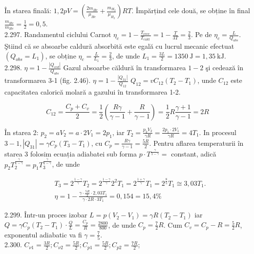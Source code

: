 \documentclass[10pt]{article}
\begin{document}
În starea finală: $1,2 p V=\left(\frac{2 m_{H e}}{\mu_{H e}}+\frac{m_{H_{2}}}{\mu_{H_{2}}}\right) R T$. Împărțind cele două, se obține în final $\frac{m_{H e}}{m_{H e}}=\frac{1}{2}=0,5$.\\
2.297. Randamentul ciclului Carnot $\eta_{c}=1-\frac{T_{\text {rece }}}{T_{\text {cald }}}=1-\frac{T}{3 T}=\frac{2}{3}$. Pe de $\eta_{c}=\frac{L}{Q_{a b s}}$. Ştiind că se absoarbe caldură absorbită este egală cu lucrul mecanic efectuat $\left(Q_{o b s}=L_{1}\right)$, se obține $\eta_{c}=\frac{L}{L_{1}}=\frac{2}{3}$, de unde $L_{1}=\frac{3 L}{2}=1350 \mathrm{~J}=1,35 \mathrm{~kJ}$.\\
2.298. $\eta=1-\frac{\left|Q_{c e d}\right|}{Q_{a b s}}$ Gazul absoarbe căldură în transformarea $1-2$ şi cedează în transformarea 3-1 (fig. 2.46). $\eta=1-\frac{\left|Q_{31}\right|}{Q_{12}}$ $Q_{12}=v C_{12}\left(T_{2}-T_{1}\right)$, unde $C_{12}$ este capacitatea calorică molară a gazului în transformarea 1-2.

$$
C_{12}=\frac{C_{p}+C_{v}}{2}=\frac{1}{2}\left(\frac{R \gamma}{\gamma-1}+\frac{R}{\gamma-1}\right)=\frac{1}{2} R \frac{\gamma+1}{\gamma-1}=2 R
$$

În starea 2: $p_{2}=a V_{2}=a \cdot 2 V_{1}=2 p_{1}$, iar $T_{2}=\frac{p_{2} V_{2}}{\gamma R}=\frac{2 p_{1} \cdot 2 V_{1}}{\gamma R}=4 T_{1}$. In procesul $3-1,\left|Q_{31}\right|=\gamma C_{p}\left(T_{3}-T_{1}\right)$, cu $C_{p}=\frac{R \gamma}{\gamma-1}=\frac{5 R}{2}$. Pentru aflarea temperaturii în starea 3 folosim ecuația adiabatei sub forma $p \cdot T^{\frac{\gamma}{1-\gamma}}=$ constant, adică $p_{2} T_{2}^{\frac{\gamma}{1-\gamma}}=p_{1} T_{3}^{\frac{\gamma}{1-\gamma}}$, de unde

$$
\begin{aligned}
& T_{3}=2^{\frac{1-\gamma}{\gamma}} T_{2}=2^{\frac{1-\gamma}{\gamma}} 2^{2} T_{1}=2^{\frac{1+\gamma}{\gamma}} T_{1}=2^{\frac{8}{5}} T_{1} \cong 3,03 T_{1} . \\
& \eta=1-\frac{\gamma \cdot \frac{5 R}{2} \cdot 2,03 T_{1}}{\gamma \cdot 2 R \cdot 3 T_{1}}=0,154=15,4 \%
\end{aligned}
$$

2.299. Într-un proces izobar $L=p\left(V_{2}-V_{1}\right)=\gamma R\left(T_{2}-T_{1}\right)$ iar $Q=\gamma C_{p}\left(T_{2}-T_{1}\right) \cdot \frac{Q}{L}=\frac{C_{p}}{R}=\frac{2800}{800}$, de unde $C_{p}=\frac{7}{2} R$. Cum $C_{v}=C_{p}-R=\frac{5}{2} R$, exponentul adiabatic va fi $\gamma=\frac{7}{5}$.\\
2.300. $C_{\nu 1}=\frac{3 R}{2} ; C_{\nu 2}=\frac{5 R}{2} ; C_{p 1}=\frac{5 R}{2} ; C_{p 2}=\frac{7 R}{2}$;
\end{document}
